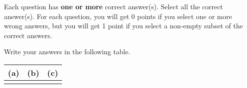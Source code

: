 
Each question has \textbf{one or more} correct answer(s). Select all the correct answer(s). For each question, you will get 0 points if you select one or more wrong answers, but you will get 1 point if you select a non-empty subset of the correct answers.

Write your answers in the following table.


\begin{table}[htbp]
	\centering
	\begin{tabular}{|p{2cm}|p{2cm}|p{2cm}|}
		\hline 
		(a) & (b) & (c) \\
		\hline
		 &  &      \vspace{0.4cm}\\
		\hline
	\end{tabular} 
\end{table}

